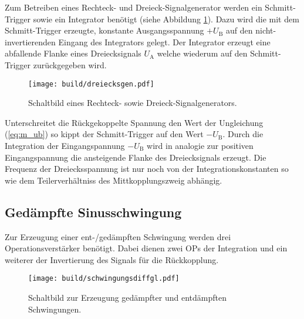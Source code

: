 Zum Betreiben eines Rechteck- und Dreieck-Signalgenerator werden
ein Schmitt-Trigger sowie ein Integrator benötigt (siehe Abbildung
\ref{fig:sig}).
Dazu wird die mit dem Schmitt-Trigger erzeugte, konstante Ausgangsspannung $+ U_\text{B}$
auf den nicht-invertierenden Eingang des Integrators gelegt.
Der Integrator erzeugt eine abfallende Flanke eines Dreiecksignals $U_\text{A}$
welche wiederum auf den Schmitt-Trigger zurückgegeben wird.
\begin{figure}[ht]
		\centering
		\texttt{[image: build/dreiecksgen.pdf]}
		\caption{Schaltbild eines Rechteck- sowie Dreieck-Signalgenerators. \cite{anleitung}}
		\label{fig:sig}
\end{figure}
Unterschreitet die Rückgekoppelte Spannung den Wert der Ungleichung (\ref{eq:m_ub})
so kippt der Schmitt-Trigger auf den Wert $-U_\text{B}$.
Durch die Integration der Eingangspannung $-U_\text{B}$ wird in analogie zur
positiven Eingangspannung die ansteigende Flanke des Dreiecksignals erzeugt.
Die Frequenz der Dreiecksspannung ist nur noch von der Integrationskonstanten so wie 
dem Teilerverhältniss des Mittkopplungszweig abhängig.


\subsection{Gedämpfte Sinusschwingung}%
\label{sub:gedaempfte_sinusschwingung}
Zur Erzeugung einer ent-/gedämpften Schwingung werden drei Operationsverstärker
benötigt.
Dabei dienen zwei OPs der Integration und ein weiterer der Invertierung
des Signals für die Rückkopplung.
\begin{figure}[ht]
		\centering
		\texttt{[image: build/schwingungsdiffgl.pdf]}
		\caption{Schaltbild zur Erzeugung gedämpfter und entdämpften Schwingungen. \cite{anleitung}}
		\label{fig:}
\end{figure}

